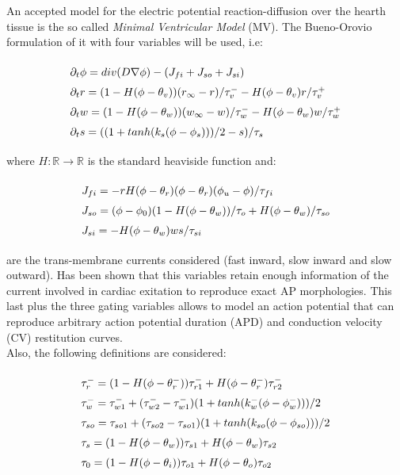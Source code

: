 An accepted model for the electric potential reaction-diffusion over the hearth tissue is the so called \textsl{Minimal Ventricular Model} (MV). The Bueno-Orovio formulation of it with four variables will be used, i.e:

\begin{equation}
\arraycolsep=1.4pt\def\arraystretch{1.5}
\begin{array}{lr}
\partial_t \phi = div(D \nabla \phi) - (J_{fi} + J_{so} + J_{si}) \\ 
\partial_t r = (1 - H(\phi - \theta_v))(r_\infty - r)/\tau_{v}^- - H(\phi - \theta_v)r/\tau_v^+ \\
\partial_t w = (1 - H(\phi - \theta_w))(w_\infty - w)/\tau_{w}^- - H(\phi - \theta_w)w/\tau_w^+ \\
\partial_t s = ((1 + tanh(k_s(\phi - \phi_s)))/2 - s)/\tau_s
\end{array} \label{eq:mde_min}
\end{equation}

where $H:\mathbb{R} \rightarrow \mathbb{R}$ is the standard heaviside function and:

\begin{equation}
\arraycolsep=1.4pt\def\arraystretch{1.5}
\begin{array}{lr}
J_{fi} = -r H(\phi - \theta_r)(\phi - \theta_r)(\phi_u - \phi)/ \tau_{fi} \\
J_{so} = (\phi - \phi_0)(1 - H(\phi - \theta_w))/\tau_o + H(\phi - \theta_w)/\tau_{so} \\
J_{si} = -H(\phi - \theta_w)ws/\tau_{si} 
\end{array} \label{eq:mde_currents}
\end{equation}

are the trans-membrane currents considered (fast inward, slow inward and slow outward). Has been shown that this variables retain enough information of the current involved in cardiac exitation to reproduce exact AP morphologies. This last plus the three gating variables allows to model an action potential that can reproduce arbitrary action potential duration (APD) and conduction velocity (CV) restitution curves. \\

Also, the following definitions are considered:

\begin{equation}
\arraycolsep=1.4pt\def\arraystretch{1.5}
\begin{array}{lr}
\tau_r^- = (1 - H(\phi - \theta_r^-))\tau_{r1}^- + H(\phi - \theta_r^-)\tau_{r2}^- \\
\tau_w^- = \tau_{w1}^- + (\tau_{w2}^- - \tau_{w1}^-)(1 + tanh(k_w^- (\phi- \phi_w^-)))/2 \\
\tau_{so} = \tau_{so1} + (\tau_{so2} - \tau_{so1})(1 + tanh(k_{so}(\phi - \phi_{so})))/2 \\
\tau_s = (1 - H(\phi - \theta_w))\tau_{s1} + H(\phi - \theta_w)\tau_{s2} \\
\tau_0 = (1 - H(\phi - \theta_i)) \tau_{o1} + H(\phi - \theta_o) \tau_{o2} \\
\end{array} \label{eq:mde_parameters}
\end{equation}

